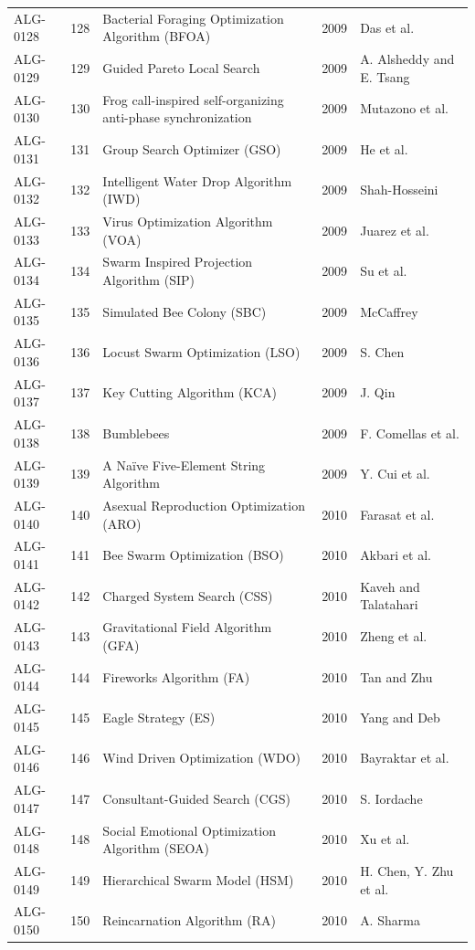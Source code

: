 \documentclass[8pt]{article}
\begin{document}
\begin{landscape}
\begin{longtable}{P{1.7cm}rP{10.0cm}rP{7.2cm}}
ALG-0128 & 128 & Bacterial Foraging Optimization Algorithm (BFOA) & 2009 & Das et al. \\
ALG-0129 & 129 & Guided Pareto Local Search & 2009 & A. Alsheddy and E. Tsang \\
ALG-0130 & 130 & Frog call-inspired self-organizing anti-phase synchronization & 2009 & Mutazono et al. \\
ALG-0131 & 131 & Group Search Optimizer (GSO) & 2009 & He et al. \\
ALG-0132 & 132 & Intelligent Water Drop Algorithm (IWD) & 2009 & Shah-Hosseini \\
ALG-0133 & 133 & Virus Optimization Algorithm (VOA) & 2009 & Juarez et al. \\
ALG-0134 & 134 & Swarm Inspired Projection Algorithm (SIP) & 2009 & Su et al. \\
ALG-0135 & 135 & Simulated Bee Colony (SBC) & 2009 & McCaffrey \\
ALG-0136 & 136 & Locust Swarm Optimization (LSO) & 2009 & S. Chen \\
ALG-0137 & 137 & Key Cutting Algorithm (KCA) & 2009 & J. Qin \\
ALG-0138 & 138 & Bumblebees & 2009 & F. Comellas et al. \\
ALG-0139 & 139 & A Naïve Five-Element String Algorithm & 2009 & Y. Cui et al. \\
ALG-0140 & 140 & Asexual Reproduction Optimization (ARO) & 2010 & Farasat et al. \\
ALG-0141 & 141 & Bee Swarm Optimization (BSO) & 2010 & Akbari et al. \\
ALG-0142 & 142 & Charged System Search (CSS) & 2010 & Kaveh and Talatahari \\
ALG-0143 & 143 & Gravitational Field Algorithm (GFA) & 2010 & Zheng et al. \\
ALG-0144 & 144 & Fireworks Algorithm (FA) & 2010 & Tan and Zhu \\
ALG-0145 & 145 & Eagle Strategy (ES) & 2010 & Yang and Deb \\
ALG-0146 & 146 & Wind Driven Optimization (WDO) & 2010 & Bayraktar et al. \\
ALG-0147 & 147 & Consultant-Guided Search (CGS) & 2010 & S. Iordache \\
ALG-0148 & 148 & Social Emotional Optimization Algorithm (SEOA) & 2010 & Xu et al. \\
ALG-0149 & 149 & Hierarchical Swarm Model (HSM) & 2010 & H. Chen, Y. Zhu et al. \\
ALG-0150 & 150 & Reincarnation Algorithm (RA) & 2010 & A. Sharma \\

\end{longtable}
\end{landscape}
\end{document}

